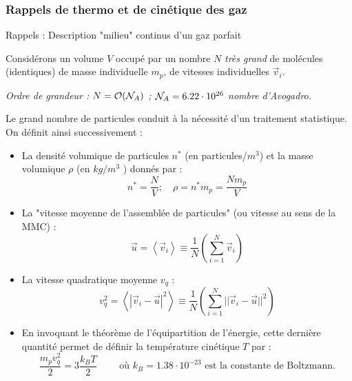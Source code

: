 \subsubsection{Rappels de thermo et de cinétique des gaz}

\begin{frame}{Rappels : Description "milieu" continus d'un gaz parfait}

\small

Considérons un volume $V$ occupé par un nombre $N$ {\em très grand} de molécules (identiques) de masse individuelle $m_p$, de vitesses individuelles $\vec{v}_i$.

\pause 

{\em Ordre de grandeur : 
$N = {\cal O}({\cal N}_A)$ ; ${\cal N}_A = 6.22 \cdot 10^{26} $ nombre d'Avogadro.
}

\smallskip


Le grand nombre de particules conduit à la nécessité d'un traitement statistique. On définit ainsi successivement :
\pause

\begin{itemize}

\item La densité volumique de particules $n^*$ (en particules/$m^3$) et la masse volumique $\rho$ 
(en $kg/m^3$ )
donnés par :
$$ n^* = \frac{N}{V} ; \quad \rho = n^* m_p = \frac{N m_p}{V} %
$$
\pause


\item La "vitesse moyenne de l'assemblée de particules" (ou vitesse au sens de la MMC) :
$$
\vec u = \left< \vec{v}_i \right> \equiv \frac{1}{N} \left(\sum\limits_{i=1}^N \vec{v}_i \right) 
$$
\pause
\item La vitesse quadratique moyenne $v_q$ :
$$
v_q^2 = \left< |\vec{v}_i-\vec{u}|^2 \right>   \equiv \frac{1}{N} \left(\sum\limits_{i=1}^N || \vec{v}_i-\vec{u}||^2  \right) 
$$
\pause
\item En invoquant le théorème de l'équipartition de l'énergie, cette dernière quantité permet de définir la température cinétique $T$ par :
$$
\frac{m_p v_q^2}{2} = 3 \frac{k_B T}{2} \qquad \mbox{ où } k_B = 1.38 \cdot 10^{-23}
\mbox{ est la constante de Boltzmann.}
$$
\pause 
\end{itemize}

\end{frame}
 
